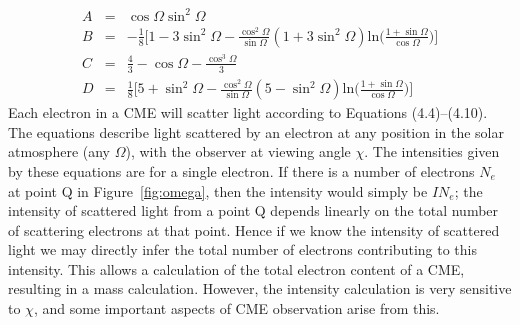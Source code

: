 \begin{eqnarray}
A &=& \cos \Omega \sin^2 \Omega \\
%
B &=& -\frac{1}{8}\bigg[1 - 3\sin^2\Omega -\frac{\cos^2\Omega}{\sin\Omega}(1+3\sin^2\Omega)\textrm{ln}\bigg(\frac{1+\sin\Omega}{\cos\Omega}\bigg)\bigg] \\
%
C &=& \frac{4}{3} - \cos\Omega - \frac{\cos^3\Omega}{3} \\
%
D &=& \frac{1}{8}\bigg[5 + \sin^2\Omega -\frac{\cos^2\Omega}{\sin\Omega}(5-\sin^2\Omega)\textrm{ln}\bigg(\frac{1+\sin\Omega}{\cos\Omega}\bigg)\bigg] 
\end{eqnarray}
Each electron in a CME will scatter light according to Equations (4.4)--(4.10). The equations describe light scattered by an electron at any position in the solar atmosphere (any $\Omega$), with the observer at viewing angle $\chi$. The intensities given by these equations are for a single electron. If there is a number of electrons $N_e$ at point Q in Figure~\ref{fig:omega}, then the intensity would simply be $IN_e$; the intensity of scattered light from a point Q depends linearly on the total number of scattering electrons at that point. Hence if we know the intensity of scattered light we may directly infer the total number of electrons contributing to this intensity. This allows a calculation of the total electron content of a CME, resulting in a mass calculation. However, the intensity calculation is very sensitive to $\chi$, and some important aspects of CME observation arise from this.
